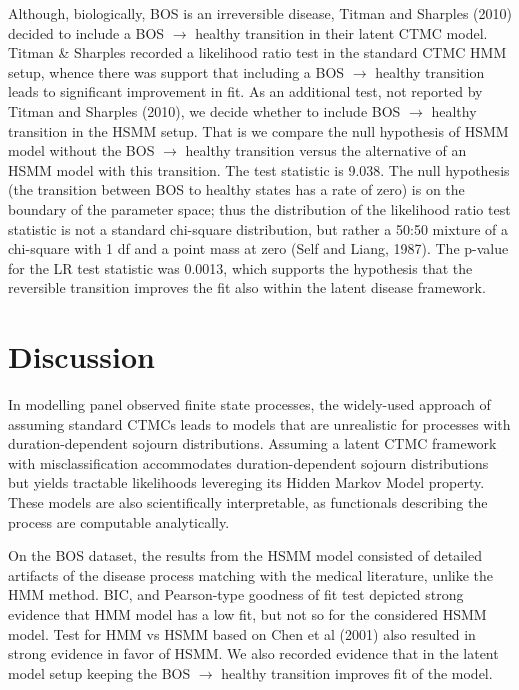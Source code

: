 \documentclass{uwstat572}
\begin{document}
Although, biologically, BOS is an irreversible disease, Titman and Sharples (2010) decided to include a BOS $\rightarrow$ healthy transition in their latent CTMC model. Titman \& Sharples recorded a likelihood ratio test in the standard CTMC HMM setup, whence there was support that including a BOS $\rightarrow$ healthy transition leads to significant improvement in fit. As an additional test, not reported by Titman and Sharples (2010), we decide whether to include BOS $\rightarrow$ healthy transition in the HSMM setup. That is we compare the null hypothesis of HSMM model without the BOS $\rightarrow$ healthy transition versus the alternative of an HSMM model with this transition. The test statistic is 9.038. The null hypothesis (the transition between BOS to healthy states has a rate of zero) is on the boundary of the parameter space; thus the distribution of the likelihood ratio test statistic is not a standard chi-square distribution, but rather a 50:50 mixture of a chi-square with 1 df and a point mass at zero (Self and Liang, 1987). The p-value for the LR test statistic was 0.0013, which supports the hypothesis that the reversible transition improves the fit also within the latent disease framework.

\section{Discussion}

In modelling panel observed finite state processes, the widely-used approach of assuming standard CTMCs leads to models that are unrealistic for processes with duration-dependent sojourn distributions. Assuming a latent CTMC framework with misclassification accommodates duration-dependent sojourn distributions but yields tractable likelihoods levereging its Hidden Markov Model property. These models are also scientifically interpretable, as functionals describing the process are computable analytically.

On the BOS dataset, the results from the HSMM model consisted of detailed artifacts of the disease process matching with the medical literature, unlike the HMM method. BIC, and Pearson-type goodness of fit test depicted strong evidence that HMM model has a low fit, but not so for the considered HSMM model. Test for HMM vs HSMM based on Chen et al (2001) also resulted in strong evidence in favor of HSMM. We also recorded evidence that in the latent model setup keeping the BOS $\rightarrow$ healthy transition improves fit of the model.
\end{document}

